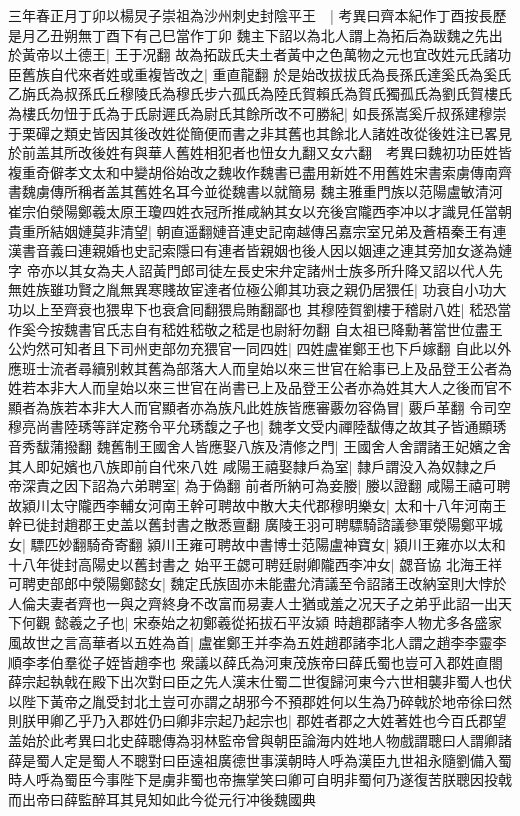 三年春正月丁卯以楊炅子崇祖為沙州刺史封陰平王　|{
	考異曰齊本紀作丁酉按長歷是月乙丑朔無丁酉下有己巳當作丁卯}
魏主下詔以為北人謂上為拓后為跋魏之先出於黃帝以土德王|{
	王于况翻}
故為拓跋氏夫土者黃中之色萬物之元也宜改姓元氏諸功臣舊族自代來者姓或重複皆改之|{
	重直龍翻}
於是始改拔拔氏為長孫氏達奚氏為奚氏乙旃氏為叔孫氏丘穆陵氏為穆氏步六孤氏為陸氏賀賴氏為賀氏獨孤氏為劉氏賀樓氏為樓氏勿忸于氏為于氏尉遲氏為尉氏其餘所改不可勝紀|{
	如長孫嵩奚斤叔孫建穆崇于栗磾之類史皆因其後改姓從簡便而書之非其舊也其餘北人諸姓改從後姓注已畧見於前盖其所改後姓有與華人舊姓相犯者也忸女九翻又女六翻　考異曰魏初功臣姓皆複重奇僻孝文太和中變胡俗始改之魏收作魏書已盡用新姓不用舊姓宋書索虜傳南齊書魏虜傳所稱者盖其舊姓名耳今並從魏書以就簡易}
魏主雅重門族以范陽盧敏清河崔宗伯滎陽鄭羲太原王瓊四姓衣冠所推咸納其女以充後宫隴西李冲以才識見任當朝貴重所結姻㜕莫非清望|{
	朝直遥翻㜕音連史記南越傳呂嘉宗室兄弟及蒼梧秦王有連漢書音義曰連親婚也史記索隱曰有連者皆親姻也後人因以姻連之連其旁加女遂為㜕字}
帝亦以其女為夫人詔黃門郎司徒左長史宋弁定諸州士族多所升降又詔以代人先無姓族雖功賢之胤無異寒賤故宦達者位極公卿其功衰之親仍居猥任|{
	功衰自小功大功以上至齊衰也猥卑下也衰倉囘翻猥烏賄翻鄙也}
其穆陸賀劉樓于稽尉八姓|{
	嵇恐當作奚今按魏書官氏志自有嵇姓嵇敬之嵇是也尉紆勿翻}
自太祖已降勳著當世位盡王公灼然可知者且下司州吏部勿充猥官一同四姓|{
	四姓盧崔鄭王也下戶嫁翻}
自此以外應班士流者尋續别敕其舊為部落大人而皇始以來三世官在給事已上及品登王公者為姓若本非大人而皇始以來三世官在尚書已上及品登王公者亦為姓其大人之後而官不顯者為族若本非大人而官顯者亦為族凡此姓族皆應審覈勿容偽冒|{
	覈戶革翻}
令司空穆亮尚書陸琇等詳定務令平允琇馥之子也|{
	魏孝文受内禪陸馛傳之故其子皆通顯琇音秀馛蒲撥翻}
魏舊制王國舍人皆應娶八族及清修之門|{
	王國舍人舍謂諸王妃嬪之舍其人即妃嬪也八族即前自代來八姓}
咸陽王禧娶隸戶為室|{
	隸戶謂没入為奴隸之戶}
帝深責之因下詔為六弟聘室|{
	為于偽翻}
前者所納可為妾媵|{
	媵以證翻}
咸陽王禧可聘故潁川太守隴西李輔女河南王幹可聘故中散大夫代郡穆明樂女|{
	太和十八年河南王幹已徙封趙郡王史盖以舊封書之散悉亶翻}
廣陵王羽可聘驃騎諮議參軍滎陽鄭平城女|{
	驃匹妙翻騎奇寄翻}
潁川王雍可聘故中書博士范陽盧神寶女|{
	潁川王雍亦以太和十八年徙封高陽史以舊封書之}
始平王勰可聘廷尉卿隴西李冲女|{
	勰音協}
北海王祥可聘吏部郎中滎陽鄭懿女|{
	魏定氏族固亦未能盡允清議至令詔諸王改納室則大悖於人倫夫妻者齊也一與之齊終身不改富而易妻人士猶或羞之况天子之弟乎此詔一出天下何觀}
懿羲之子也|{
	宋泰始之初鄭羲從拓拔石平汝潁}
時趙郡諸李人物尤多各盛家風故世之言高華者以五姓為首|{
	盧崔鄭王并李為五姓趙郡諸李北人謂之趙李李靈李順李孝伯羣從子姪皆趙李也}
衆議以薛氏為河東茂族帝曰薛氏蜀也豈可入郡姓直閤薛宗起執戟在殿下出次對曰臣之先人漢末仕蜀二世復歸河東今六世相襲非蜀人也伏以陛下黃帝之胤受封北土豈可亦謂之胡邪今不預郡姓何以生為乃碎戟於地帝徐曰然則朕甲卿乙乎乃入郡姓仍曰卿非宗起乃起宗也|{
	郡姓者郡之大姓著姓也今百氏郡望盖始於此考異曰北史薛聰傳為羽林監帝曾與朝臣論海内姓地人物戲謂聰曰人謂卿諸薛是蜀人定是蜀人不聰對曰臣遠祖廣德世事漢朝時人呼為漢臣九世祖永隨劉備入蜀時人呼為蜀臣今事陛下是虜非蜀也帝撫掌笑曰卿可自明非蜀何乃遂復苦朕聰因投戟而出帝曰薛監醉耳其見知如此今從元行冲後魏國典}
